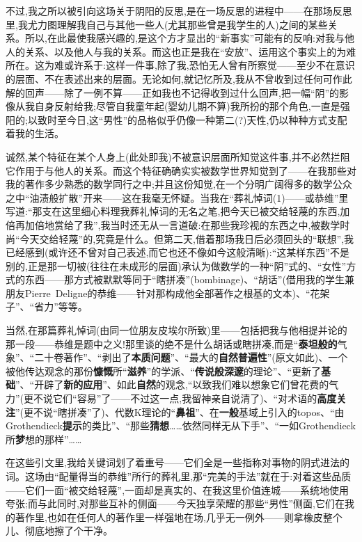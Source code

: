 不过,我之所以被引向这场关于阴阳的反思,是在一场反思的进程中——在那场反思里,我尤力图理解我自己与其他一些人(尤其那些曾是我学生的人)之间的某些关系。所以,在此最使我感兴趣的,是这个方才显出的“新事实”可能有的反响:对我与他人的关系、以及他人与我的关系。而这也正是我在“安放”、运用这个事实上的为难所在。这为难或许系于:这样一件事,除了我,恐怕无人曾有所察觉——至少不在意识的层面、不在表述出来的层面。无论如何,就记忆所及,我从不曾收到过任何可作此解的回声——除了一例不算——正如我也不记得收到过什么回声,把一幅“阴”的影像从我自身反射给我;尽管自我童年起(婴幼儿期不算)我所扮的那个角色,一直是强阳的;以致时至今日,这“男性”的品格似乎仍像一种第二(?)天性,仍以种种方式支配着我的生活。

诚然,某个特征在某个人身上(此处即我)不被意识层面所知觉这件事,并不必然拦阻它作用于与他人的关系。而这个特征确确实实被数学世界知觉到了——在我那些对我的著作多少熟悉的数学同行之中;并且这份知觉,在一个分明广阔得多的数学公众之中“油渍般扩散”开来——这在我毫无怀疑。当我在“葬礼悼词(1)——或恭维”里写道:“那支在这里细心料理我葬礼悼词的无名之笔,把今天已被交给轻蔑的东西,加倍再加倍地赏给了我”,我当时还无从一言道破:在那些我珍视的东西之中,被数学时尚“今天交给轻蔑”的,究竟是什么。但第二天,借着那场我日后必须回头的“联想”,我已经感到(或许还不曾对自己表述,而它也还不像如今这般清晰):“这某样东西”不是别的,正是那一切被(往往在未成形的层面)承认为做数学的一种“阴”式的、“女性”方式的东西——那方式被默默等同于“瞎拼凑”(bombinage)、“胡话”(借用我的学生兼朋友Pierre~Deligne的恭维——针对那构成他全部著作之根基的文本)、“花架子”、“省力”等等。

当然,在那篇葬礼悼词(由同一位朋友皮埃尔所致)里——包括把我与他相提并论的那一段——恭维是题中之义!那里谈的绝不是什么胡话或瞎拼凑,而是“\textbf{泰坦般的}气象”、“二十卷著作”、“剥出了\textbf{本质问题}”、“最大的\textbf{自然普遍性}”(原文如此)、一个被他传达观念的那份\textbf{慷慨}所“\textbf{滋养}”的学派、“\textbf{传说般深邃}的理论”、“更新了\textbf{基础}”、“开辟了\textbf{新的应用}”、如此\textbf{自然}的观念,“以致我们难以想象它们曾花费的气力”(更不说它们“容易”了——不过这一点,我留神亲自说清了)\dmark{}、“对术语的\textbf{高度关注}”(更不说“瞎拼凑”了)、代数K理论的“\textbf{鼻祖}”、在\textbf{一般}基域上引入的topos、“由Grothendieck\textbf{提示}的类比”、“那些\textbf{猜想}……依然同样无从下手”、“一如Grothendieck所\textbf{梦}想的那样”……

在这些引文里,我给关键词划了着重号——它们全是一些指称对事物的阴式进法的词。这场由“配量得当的恭维”所行的葬礼里,那“完美的手法”就在于:对着这些品质——它们一面“被交给轻蔑”,一面却是真实的、在我这里价值连城——系统地使用夸张;而与此同时,对那些互补的侧面——今天独享荣耀的那些“男性”侧面,它们在我的著作里,也如在任何人的著作里一样强地在场,几乎无一例外——则拿橡皮整个儿、彻底地擦了个干净。

